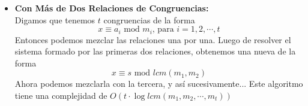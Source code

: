 \begin{itemize}
{		Si $m_1, m_2 \leq 10^9$, entonces $lcm(m_1, m_2) \leq 10^{18}$, $x' \leq 10^9$, $\frac{a_2 - a_1}{d} \leq 10^9$
		Podemos calcular $x' \cdot \frac{a_2 - a_1}{d} $, pero ya que e\'l y $l$ pueden ser hasta $10^{18}$, la multiplicaci\'on
		final por $m_1$ causar\'a un desbordamiento. Para manejar este problema usaremos la propiedad:
		$$ c a \text{ mod } cb = c( a \text{ mod 	} b )$$
		Sabiendo que $lcm(m_1, m_2) = \frac{m_2}{d} \cdot m_1$ y tomando en la propiedad anterior $a = x' \cdot \frac{a_2-a_1}{d}$, 
		$b = \frac{m_2}{d}$ y $c = m_1$, tenemos que 
		$\left( x' \cdot \frac{a_2 - a_1}{d} \text{ mod } l \right) \cdot m_1 \text{ mod } l$ es igual a:
		$$ \left( x' \cdot \frac{a_2 - a_1}{d} \text{ mod } \frac{m_2}{d} \right) \cdot m_1 \text{ mod }l$$
		Ya que $\frac{m_2}{d} \leq 10^9$, es problema de desbordamiento est\'a solucionado.
    }
    \item{
		\textbf{Con M\'as de Dos Relaciones de Congruencias:}\\
			Digamos que tenemos $t$ congruencias de la forma 
			$$ x \equiv a_i \text{ mod } m_i \text{, para } i = 1, 2, \cdots, t$$
			Entonces podemos mezclar las relaciones una por una. Luego de resolver el sistema formado por las primeras dos 
			relaciones, obtenemos una nueva de la forma 
			$$ x \equiv s \text{ mod } lcm(m_1, m_2) $$
			Ahora podemos mezclarla con la tercera, y as\'i sucesivamente... Este algoritmo tiene una complejidad de 
			$O(t \cdot \log lcm(m_1, m_2, \cdots, m_t))$ 
    }
\end{itemize}
